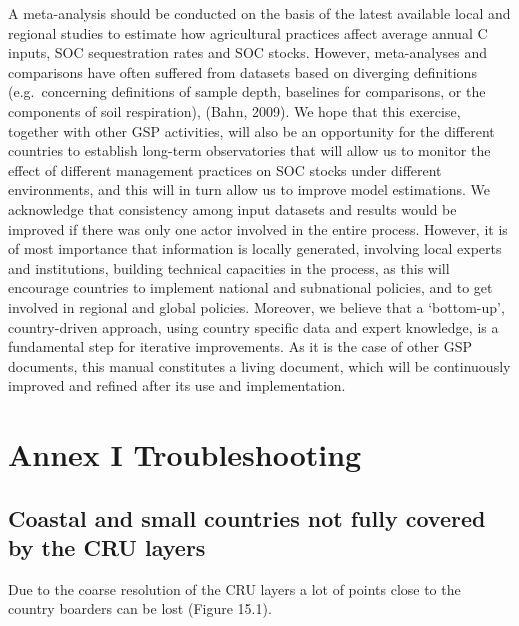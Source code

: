 \documentclass[
  10pt,
  b5paper,
]{book}
\begin{document}
A meta-analysis should be conducted on the basis of the latest available local and regional studies to estimate how agricultural practices affect average annual C inputs, SOC sequestration rates and SOC stocks. However, meta-analyses and comparisons have often suffered from datasets based on diverging definitions (e.g.~concerning definitions of sample depth, baselines for comparisons, or the components of soil respiration), (Bahn, 2009). We hope that this exercise, together with other GSP activities, will also be an opportunity for the different countries to establish long-term observatories that will allow us to monitor the effect of different management practices on SOC stocks under different environments, and this will in turn allow us to improve model estimations.
We acknowledge that consistency among input datasets and results would be improved if there was only one actor involved in the entire process. However, it is of most importance that information is locally generated, involving local experts and institutions, building technical capacities in the process, as this will encourage countries to implement national and subnational policies, and to get involved in regional and global policies. Moreover, we believe that a `bottom-up', country-driven approach, using country specific data and expert knowledge, is a fundamental step for iterative improvements. As it is the case of other GSP documents, this manual constitutes a living document, which will be continuously improved and refined after its use and implementation.

\hypertarget{annex-i-troubleshooting}{%
\chapter*{Annex I Troubleshooting}\label{annex-i-troubleshooting}}

\hypertarget{coastal-and-small-countries-not-fully-covered-by-the-cru-layers}{%
\section*{Coastal and small countries not fully covered by the CRU layers}\label{coastal-and-small-countries-not-fully-covered-by-the-cru-layers}}

Due to the coarse resolution of the CRU layers a lot of points close to the country boarders can be lost (Figure 15.1).
\end{document}
